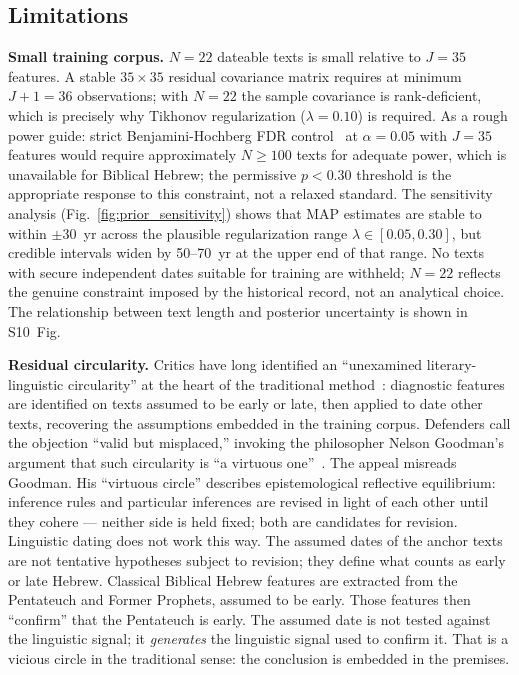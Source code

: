 \documentclass[10pt,letterpaper]{article}
\begin{document}
\subsection*{Limitations}

\textbf{Small training corpus.}  $N = 22$ dateable texts is small relative
to $J = 35$ features.  A stable $35 \times 35$ residual covariance
matrix requires at minimum $J + 1 = 36$ observations; with $N = 22$ the
sample covariance is rank-deficient, which is precisely why Tikhonov
regularization ($\lambda = 0.10$) is required.  As a rough power guide:
strict Benjamini-Hochberg FDR control~\cite{Benjamini1995} at $\alpha = 0.05$ with $J = 35$
features would require approximately $N \geq 100$ texts for adequate
power, which is unavailable for Biblical Hebrew; the permissive $p < 0.30$
threshold is the appropriate response to this constraint, not a relaxed
standard.  The sensitivity analysis (Fig.~\ref{fig:prior_sensitivity})
shows that MAP estimates are stable to within $\pm 30$~yr across the
plausible regularization range $\lambda \in [0.05, 0.30]$, but credible
intervals widen by 50--70~yr at the upper end of that range.  No texts
with secure independent dates suitable for training are withheld; $N = 22$
reflects the genuine constraint imposed by the historical record, not an
analytical choice.  The relationship between text length and posterior
uncertainty is shown in S10~Fig.

\textbf{Residual circularity.}  Critics have long identified an
``unexamined literary-linguistic circularity'' at the heart of the
traditional method~\cite{Young2003,Young2008,Rezetko2014}: diagnostic
features are identified on texts assumed to be early or late, then
applied to date other texts, recovering the assumptions embedded in the
training corpus.  Defenders call the objection ``valid but misplaced,''
invoking the philosopher Nelson Goodman's argument that such circularity
is ``a virtuous one''~\cite{Hendel2018}.  The appeal misreads Goodman.
His ``virtuous circle'' describes epistemological reflective equilibrium:
inference rules and particular inferences are revised in light of each
other until they cohere --- neither side is held fixed; both are
candidates for revision.  Linguistic dating does not work this way.  The
assumed dates of the anchor texts are not tentative hypotheses subject to
revision; they define what counts as early or late Hebrew.  Classical
Biblical Hebrew features are extracted from the Pentateuch and Former
Prophets, assumed to be early.  Those features then ``confirm'' that the
Pentateuch is early.  The assumed date is not tested against the
linguistic signal; it \emph{generates} the linguistic signal used to
confirm it.  That is a vicious circle in the traditional sense: the
conclusion is embedded in the premises.
\end{document}
